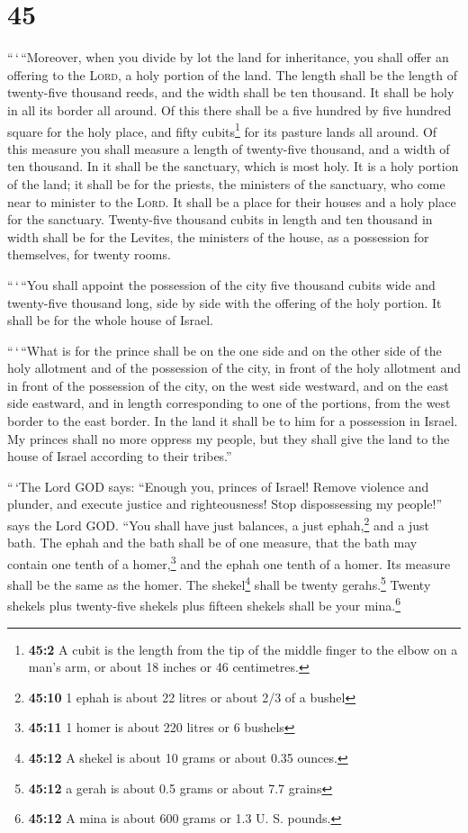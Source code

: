 \hypertarget{section-44}{%
\section{45}\label{section-44}}

 ``\,`\,``Moreover, when you divide by lot the land for
inheritance, you shall offer an offering to the \textsc{Lord}, a holy
portion of the land. The length shall be the length of twenty-five
thousand reeds, and the width shall be ten thousand. It shall be holy in
all its border all around.  Of this there shall be a five
hundred by five hundred square for the holy place, and fifty
cubits\footnote{\textbf{45:2} A cubit is the length from the tip of the
  middle finger to the elbow on a man's arm, or about 18 inches or 46
  centimetres.} for its pasture lands all around.  Of this
measure you shall measure a length of twenty-five thousand, and a width
of ten thousand. In it shall be the sanctuary, which is most holy.
 It is a holy portion of the land; it shall be for the
priests, the ministers of the sanctuary, who come near to minister to
the \textsc{Lord}. It shall be a place for their houses and a holy place
for the sanctuary.  Twenty-five thousand cubits in length
and ten thousand in width shall be for the Levites, the ministers of the
house, as a possession for themselves, for twenty rooms.

 ``\,`\,``You shall appoint the possession of the city
five thousand cubits wide and twenty-five thousand long, side by side
with the offering of the holy portion. It shall be for the whole house
of Israel.

 ``\,`\,``What is for the prince shall be on the one side
and on the other side of the holy allotment and of the possession of the
city, in front of the holy allotment and in front of the possession of
the city, on the west side westward, and on the east side eastward, and
in length corresponding to one of the portions, from the west border to
the east border.  In the land it shall be to him for a
possession in Israel. My princes shall no more oppress my people, but
they shall give the land to the house of Israel according to their
tribes.''

 ``\,`The Lord GOD says: ``Enough you, princes of Israel!
Remove violence and plunder, and execute justice and righteousness! Stop
dispossessing my people!'' says the Lord GOD.  ``You
shall have just balances, a just ephah,\footnote{\textbf{45:10} 1 ephah
  is about 22 litres or about 2/3 of a bushel} and a just bath.
 The ephah and the bath shall be of one measure, that the
bath may contain one tenth of a homer,\footnote{\textbf{45:11} 1 homer
  is about 220 litres or 6 bushels} and the ephah one tenth of a homer.
Its measure shall be the same as the homer.  The
shekel\footnote{\textbf{45:12} A shekel is about 10 grams or about 0.35
  ounces.} shall be twenty gerahs.\footnote{\textbf{45:12} a gerah is
  about 0.5 grams or about 7.7 grains} Twenty shekels plus twenty-five
shekels plus fifteen shekels shall be your mina.\footnote{\textbf{45:12}
  A mina is about 600 grams or 1.3 U. S. pounds.}

